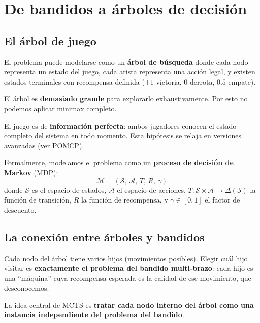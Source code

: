 \documentclass[12pt, a4paper]{article}
\newcounter{hipnum}
\newcommand{\hip}[1]{%
  \stepcounter{hipnum}%
  \begin{tcolorbox}[hipotesis, title={Hipótesis H\thehipnum}]
    #1
  \end{tcolorbox}%
}
\begin{document}
\section{De bandidos a árboles de decisión}

\subsection{El árbol de juego}

\hip{El problema puede modelarse como un \textbf{árbol de búsqueda} donde
cada nodo representa un estado del juego, cada arista representa una acción
legal, y existen estados terminales con recompensa definida ($+1$ victoria,
$0$ derrota, $0.5$ empate).}

\hip{El árbol es \textbf{demasiado grande} para explorarlo exhaustivamente. Por
esto no podemos aplicar minimax completo.}

\hip{El juego es de \textbf{información perfecta}: ambos jugadores conocen el
estado completo del sistema en todo momento. Esta hipótesis se relaja en
versiones avanzadas (ver POMCP).}

Formalmente, modelamos el problema como un \textbf{proceso de decisión de
Markov} (MDP):
\[
  \mathcal{M} = (\mathcal{S},\, \mathcal{A},\, T,\, R,\, \gamma)
\]
donde $\mathcal{S}$ es el espacio de estados, $\mathcal{A}$ el espacio de
acciones, $T: \mathcal{S}\times\mathcal{A} \to \Delta(\mathcal{S})$ la función
de transición, $R$ la función de recompensa, y $\gamma \in [0,1]$ el factor de
descuento.

\subsection{La conexión entre árboles y bandidos}

\begin{tcolorbox}[clave]
Cada nodo del árbol tiene varios hijos (movimientos posibles). Elegir cuál hijo
visitar es \textbf{exactamente el problema del bandido multi-brazo}: cada hijo
es una ``máquina'' cuya recompensa esperada es la calidad de ese movimiento,
que desconocemos.

La idea central de MCTS es \textbf{tratar cada nodo interno del árbol como una
instancia independiente del problema del bandido}.
\end{tcolorbox}
\end{document}
